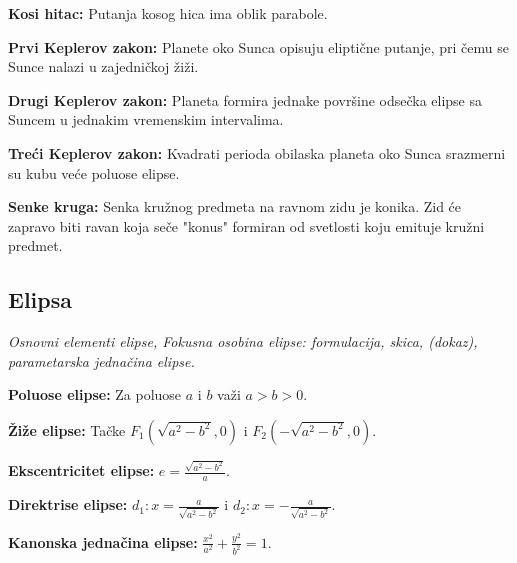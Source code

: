 \documentclass[12pt]{article}
\begin{document}
\textbf{Kosi hitac:} Putanja kosog hica ima oblik parabole.
\par

\textbf{Prvi Keplerov zakon:} Planete oko Sunca opisuju eliptične putanje, pri
čemu se Sunce nalazi u zajedničkoj žiži.
\par

\textbf{Drugi Keplerov zakon:} Planeta formira jednake površine odsečka elipse
sa Suncem u jednakim vremenskim intervalima.
\par

\textbf{Treći Keplerov zakon:} Kvadrati perioda obilaska planeta oko Sunca
srazmerni su kubu veće poluose elipse.
\par

\textbf{Senke kruga:} Senka kružnog predmeta na ravnom zidu je konika. Zid
će zapravo biti ravan koja seče "konus" formiran od svetlosti koju emituje
kružni predmet.

\subsection{Elipsa}
\textit{Osnovni elementi elipse, Fokusna osobina elipse: formulacija, skica,
    (dokaz), parametarska jednačina elipse.}
\par
\vspace*{1cm}

\textbf{Poluose elipse:} Za poluose $a$ i $b$ važi $a>b>0$.
\par

\textbf{Žiže elipse:} Tačke $F_1(\sqrt{a^2-b^2},0)$ i $F_2(-\sqrt{a^2-b^2},0)$.
\par

\textbf{Ekscentricitet elipse:} $e=\frac{\sqrt{a^2-b^2}}{a}$.
\par

\textbf{Direktrise elipse:} $d_1: x=\frac{a}{\sqrt{a^2-b^2}}$ i
$d_2: x=-\frac{a}{\sqrt{a^2-b^2}}$.
\par

\textbf{Kanonska jednačina elipse:} $\frac{x^2}{a^2}+\frac{y^2}{b^2}=1$.
\par
\end{document}
